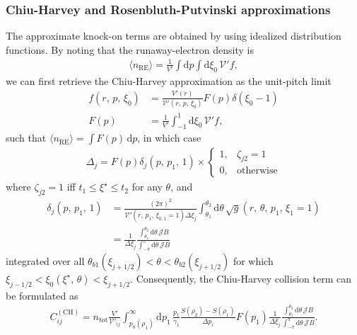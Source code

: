 \documentclass[11pt,a4paper]{article}
\newcommand{\rd}{\ensuremath{\mathrm{d}}}
\newcommand{\sub}[1]{\ensuremath{_{\text{#1}}}}
\begin{document}
\subsubsection{Chiu-Harvey and Rosenbluth-Putvinski approximations}
The approximate knock-on terms are obtained by using idealized distribution functions. By noting that the runaway-electron density is 
\begin{align}
\langle n\sub{RE}\rangle = \frac{1}{V'} \int \rd p \int \rd \xi_0 \, \mathcal{V}' f,
\end{align}
we can first retrieve the Chiu-Harvey approximation as the unit-pitch limit
\begin{align}
f(r,\,p,\,\xi_0) &= \frac{V'(r)}{\mathcal{V}'(r,\,p,\,\xi_0)}F(p) \delta(\xi_0-1) \\
F(p) &= \frac{1}{V'}\int_{-1}^1 \rd \xi_0 \,\mathcal{V}'f,
\end{align}
such that $\langle n\sub{RE}\rangle = \int F(p)\,\rd p$,
in which case
\begin{align}
\Delta_j =  F(p) \delta_j(p,\,p_1,\,1) \times \begin{cases}
1, & \zeta_{j2}=1 \\
0, & \mathrm{otherwise}
\end{cases}
\end{align}
where $\zeta_{j2}=1$ iff $t_1 \leq \xi^\star \leq t_2$ for any $\theta$, and 
\begin{align}
\delta_j(p,\,p_1,\,1) &= \frac{(2\pi)^2}{\mathcal{V}'(r,\,p_1,\,\xi_{0,1}=1)\Delta \xi_j}\int_{\theta_1}^{\theta_2}\rd \theta \,\sqrt{g}(r,\,\theta,\,p_1,\,\xi_1=1) \nonumber \\
&= \frac{1}{\Delta \xi_j} \frac{\int_{\theta_1}^{\theta_2}\rd \theta \,\mathcal{J}B}{\int_{-\pi}^{\pi}\rd \theta \,\mathcal{J}B}
\end{align}
integrated over all $\theta_{b1}(\xi_{j+1/2}) < \theta < \theta_{b2}(\xi_{j+1/2})$ for which $\xi_{j-1/2} < \xi_0(\xi^\star,\,\theta) < \xi_{j+1/2}$.
Consequently, the Chiu-Harvey collision term can be formulated as
\begin{align}
C_{ij}^{(\mathrm{CH})} = n\sub{tot}\frac{V'}{\mathcal{V}'_{ij}}\int_{p_0(\rho_1)}^\infty \rd p_1 \, \frac{p_1}{\gamma_1}\frac{S(\rho_2) - S(\rho_1)}{\Delta p_i} F(p_1) \frac{1}{\Delta \xi_j} \frac{\int_{\theta_1}^{\theta_2}\rd \theta \,\mathcal{J}B}{\int_{-\pi}^{\pi}\rd \theta \,\mathcal{J}B}.
\end{align}
\end{document}
